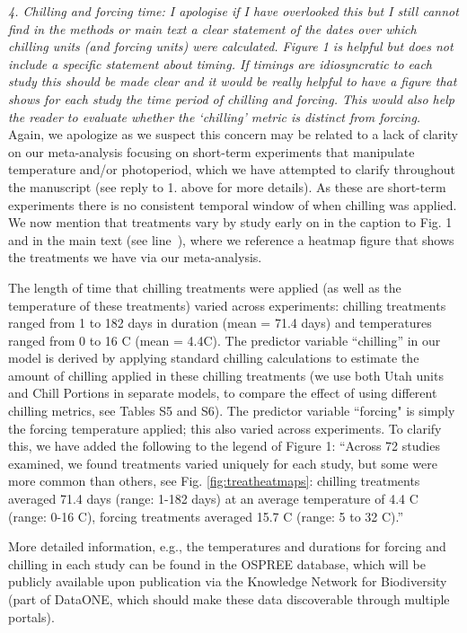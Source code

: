 \documentclass{article}
\newcommand{\lr}[1]{line~\lineref{#1}}
\begin{document}
{\emph{4. Chilling and forcing time: I apologise if I have overlooked this but I still cannot find in the
methods or main text a clear statement of the dates over which chilling units (and forcing
units) were calculated. Figure 1 is helpful but does not include a specific statement about
timing. If timings are idiosyncratic to each study this should be made clear and it would be
really helpful to have a figure that shows for each study the time period of chilling and forcing.
This would also help the reader to evaluate whether the `chilling' metric is distinct from
forcing.}\\

Again, we apologize as we suspect this concern may be related to a lack of clarity on our meta-analysis focusing on short-term experiments that manipulate temperature and/or photoperiod, which we have attempted to clarify throughout the manuscript (see reply to 1. above for more details). As these are short-term experiments there is no consistent temporal window of when chilling was applied. We now mention that treatments vary by study early on in the caption to Fig. 1 and in the main text (see \lr{heatmap}), where we reference a heatmap figure that shows the treatments we have via our meta-analysis.

The length of time that chilling treatments were applied (as well as the temperature of these treatments) varied across experiments: chilling treatments ranged from 1 to 182 days in duration (mean = 71.4 days) and temperatures ranged from  0 to 16 \degree C (mean = 4.4\degree C). The predictor variable ``chilling'' in our model is derived by applying standard chilling calculations to estimate the amount of chilling applied in these chilling treatments (we use both Utah units and Chill Portions in separate models, to compare the effect of using different chilling metrics, see Tables S5 and S6). The predictor variable ``forcing" is simply the forcing temperature applied; this also varied across experiments. To clarify this, we have added the following to the legend of Figure 1: ``Across 72 studies examined, we found treatments varied uniquely for each study, but some were more common than others, see Fig. \ref{fig:treatheatmaps}: chilling treatments averaged 71.4 days (range: 1-182 days) at an average temperature of 4.4 \degree C (range: 0-16 \degree C), forcing treatments averaged 15.7 \degree C (range: 5 to 32 \degree C).''

More detailed information, e.g., the temperatures and durations for forcing and chilling in each study can be found in the OSPREE database, which will be publicly available upon publication via the Knowledge Network for Biodiversity (part of DataONE, which should make these data discoverable through multiple portals). \\

}
\end{document}
